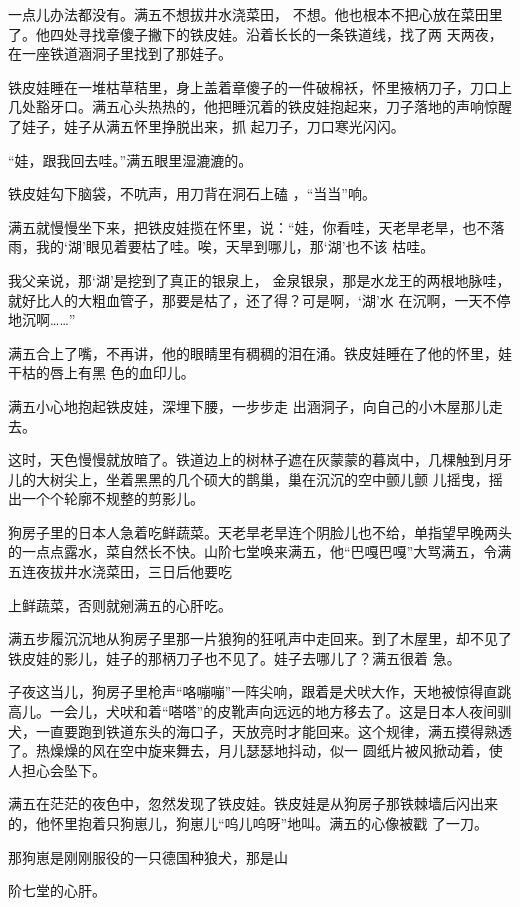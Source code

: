 \documentclass{article}
\begin{document}
一点儿办法都没有。满五不想拔井水浇菜田，
\newpage
不想。他也根本不把心放在菜田里了。他四处寻找章傻子撇下的铁皮娃。沿着长长的一条铁道线，找了两
天两夜，在一座铁道涵洞子里找到了那娃子。 

铁皮娃睡在一堆枯草秸里，身上盖着章傻子的一件破棉袄，怀里掖柄刀子，刀口上几处豁牙口。满五心头热热的，他把睡沉着的铁皮娃抱起来，刀子落地的声响惊醒了娃子，娃子从满五怀里挣脱出来，抓
起刀子，刀口寒光闪闪。 


“娃，跟我回去哇。”满五眼里湿漉漉的。 

铁皮娃勾下脑袋，不吭声，用刀背在洞石上磕
，“当当”响。 

满五就慢慢坐下来，把铁皮娃揽在怀里，说：“娃，你看哇，天老旱老旱，也不落雨，我的‘湖’眼见着要枯了哇。唉，天旱到哪儿，那‘湖’也不该
枯哇。 

我父亲说，那‘湖’是挖到了真正的银泉上，
\newpage
金泉银泉，那是水龙王的两根地脉哇，就好比人的大粗血管子，那要是枯了，还了得？可是啊，‘湖’水
在沉啊，一天不停地沉啊……” 

满五合上了嘴，不再讲，他的眼睛里有稠稠的泪在涌。铁皮娃睡在了他的怀里，娃干枯的唇上有黑
色的血印儿。 

满五小心地抱起铁皮娃，深埋下腰，一步步走
出涵洞子，向自己的小木屋那儿走去。 

这时，天色慢慢就放暗了。铁道边上的树林子遮在灰蒙蒙的暮岚中，几棵触到月牙儿的大树尖上，坐着黑黑的几个硕大的鹊巢，巢在沉沉的空中颤儿颤
儿摇曳，摇出一个个轮廓不规整的剪影儿。 

狗房子里的日本人急着吃鲜蔬菜。天老旱老旱连个阴脸儿也不给，单指望早晚两头的一点点露水，菜自然长不快。山阶七堂唤来满五，他“巴嘎巴嘎”大骂满五，令满五连夜拔井水浇菜田，三日后他要吃

\newpage
上鲜蔬菜，否则就剜满五的心肝吃。 

满五步履沉沉地从狗房子里那一片狼狗的狂吼声中走回来。到了木屋里，却不见了铁皮娃的影儿，娃子的那柄刀子也不见了。娃子去哪儿了？满五很着
急。 

子夜这当儿，狗房子里枪声“咯嘣嘣”一阵尖响，跟着是犬吠大作，天地被惊得直跳高儿。一会儿，犬吠和着“嗒嗒”的皮靴声向远远的地方移去了。这是日本人夜间驯犬，一直要跑到铁道东头的海口子，天放亮时才能回来。这个规律，满五摸得熟透了。热燥燥的风在空中旋来舞去，月儿瑟瑟地抖动，似一
圆纸片被风掀动着，使人担心会坠下。 

满五在茫茫的夜色中，忽然发现了铁皮娃。铁皮娃是从狗房子那铁棘墙后闪出来的，他怀里抱着只狗崽儿，狗崽儿“呜儿呜呀”地叫。满五的心像被戳
了一刀。 

那狗崽是刚刚服役的一只德国种狼犬，那是山

\newpage
阶七堂的心肝。 
\end{document}
